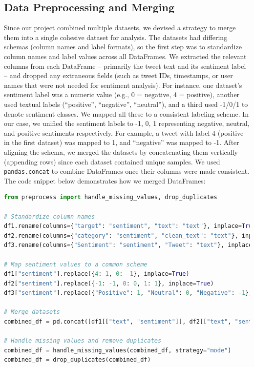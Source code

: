 \subsection{Data Preprocessing and Merging} 

Since our project combined multiple datasets, we devised a strategy to merge them into a single cohesive dataset for analysis. The datasets had differing schemas (column names and label formats), so the first step was to standardize column names and label values across all DataFrames. We extracted the relevant columns from each DataFrame – primarily the tweet text and its sentiment label – and dropped any extraneous fields (such as tweet IDs, timestamps, or user names that were not needed for sentiment analysis). For instance, one dataset’s sentiment label was a numeric value (e.g., 0 = negative, 4 = positive), another used textual labels (“positive”, “negative”, “neutral”), and a third used -1/0/1 to denote sentiment classes. We mapped all these to a consistent labeling scheme. In our case, we unified the sentiment labels to {-1, 0, 1} representing negative, neutral, and positive sentiments respectively. For example, a tweet with label 4 (positive in the first dataset) was mapped to 1, and “negative” was mapped to -1. After aligning the schema, we merged the datasets by concatenating them vertically (appending rows) since each dataset contained unique samples. We used \texttt{pandas.concat} to combine DataFrames once their columns were made consistent. The code snippet below demonstrates how we merged DataFrames:

\begin{lstlisting}[language=Python]
from preprocess import handle_missing_values, drop_duplicates

# Standardize column names
df1.rename(columns={"target": "sentiment", "text": "text"}, inplace=True)
df2.rename(columns={"category": "sentiment", "clean_text": "text"}, inplace=True)
df3.rename(columns={"Sentiment": "sentiment", "Tweet": "text"}, inplace=True)

# Map sentiment values to a common scheme
df1["sentiment"].replace({4: 1, 0: -1}, inplace=True)
df2["sentiment"].replace({-1: -1, 0: 0, 1: 1}, inplace=True)
df3["sentiment"].replace({"Positive": 1, "Neutral": 0, "Negative": -1}, inplace=True)

# Merge datasets
combined_df = pd.concat([df1[["text", "sentiment"]], df2[["text", "sentiment"]], df3[["text", "sentiment"]]], ignore_index=True)

# Handle missing values and remove duplicates
combined_df = handle_missing_values(combined_df, strategy="mode")
combined_df = drop_duplicates(combined_df)
\end{lstlisting}

